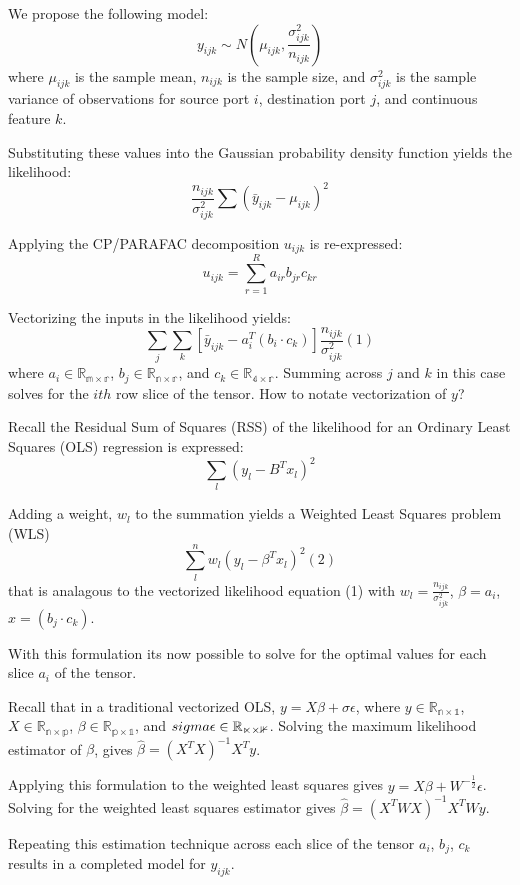 \documentclass[12pt,twoside]{dukestatscithesis}
\theoremstyle{definition}
\theoremstyle{definition}
\theoremstyle{definition}
\theoremstyle{remark}
\begin{document}
We propose the following model:
\[y_{ijk} \sim N(\mu_{ijk}, \frac{\sigma^2_{ijk}}{n_{ijk}})\] where
\(\mu_{ijk}\) is the sample mean, \(n_{ijk}\) is the sample size, and
\(\sigma^2_{ijk}\) is the sample variance of observations for source
port \(i\), destination port \(j\), and continuous feature \(k\).

Substituting these values into the Gaussian probability density function
yields the likelihood:
\[\frac{n_{ijk}}{\sigma^2_{ijk}}\sum(\bar y_{ijk} - \mu_{ijk})^2\]

Applying the CP/PARAFAC decomposition \(u_{ijk}\) is re-expressed:
\[u_{ijk} = \sum_{r=1}^Ra_{ir}b_{jr}c_{kr}\]

Vectorizing the inputs in the likelihood yields:
\[\sum_j\sum_k[\bar y_{ijk} - a_i^T(b_i \cdotp c_k)]\frac{n_{ijk}}{\sigma^2_{ijk}} (1)\]
where \(a_i \in \mathbb{R_{m \times r}}\),
\(b_j \in \mathbb{R_{n \times r}}\), and
\(c_k \in \mathbb{R_{4 \times r}}\). Summing across \(j\) and \(k\) in
this case solves for the \(ith\) row slice of the tensor. How to notate
vectorization of \(y\)?

Recall the Residual Sum of Squares (RSS) of the likelihood for an
Ordinary Least Squares (OLS) regression is expressed:
\[\sum_l(y_l-B^Tx_l)^2\]

Adding a weight, \(w_l\) to the summation yields a Weighted Least
Squares problem (WLS) \[\sum_l^nw_l(y_l-\beta^Tx_l)^2 (2)\] that is
analagous to the vectorized likelihood equation (1) with
\(w_l = \frac{n_{ijk}}{\sigma^2_{ijk}}\), \(\beta = a_i\),
\(x = (b_j \cdotp c_k)\).

With this formulation its now possible to solve for the optimal values
for each slice \(a_i\) of the tensor.

Recall that in a traditional vectorized OLS,
\(y = X\beta + \sigma\epsilon\), where
\(y \in \mathbb{R_{n \times 1}}\), \(X \in \mathbb{R_{n \times p}}\),
\(\beta \in \mathbb{R_{p \times 1}}\), and
\(\\sigma\epsilon \in \mathbb{R_{n \times 1}}\). Solving the maximum
likelihood estimator of \(\beta\), gives
\(\hat \beta = (X^TX)^{-1}X^Ty\).

Applying this formulation to the weighted least squares gives
\(y = X\beta + W^{-\frac{1}{2}}\epsilon\). Solving for the weighted
least squares estimator gives \(\hat \beta = (X^TWX)^{-1}X^TWy\).

Repeating this estimation technique across each slice of the tensor
\(a_i\), \(b_j\), \(c_k\) results in a completed model for \(y_{ijk}\).
\end{document}
